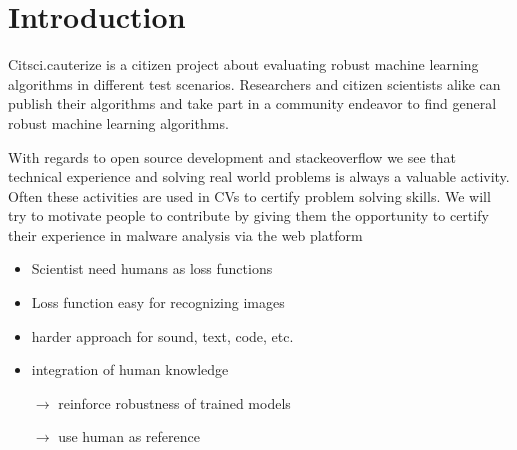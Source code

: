 \chapter{Introduction}\label{ch:introduction}
Citsci.cauterize is a citizen project about evaluating robust machine learning algorithms in different test scenarios.
Researchers and citizen scientists alike can publish their algorithms and take part in a community endeavor to find general robust machine learning algorithms.

With regards to open source development and stackeoverflow we see that technical experience and solving real world problems is always a valuable activity.
Often these activities are used in CVs to certify problem solving skills.
We will try to motivate people to contribute by giving them the opportunity to certify their experience in malware analysis via the web platform

\begin{itemize}
    \item Scientist need humans as loss functions
    \item Loss function easy for recognizing images
\end{itemize}

\begin{itemize}
    \item harder approach for sound, text, code, etc.
    \item integration of human knowledge
            
    $\rightarrow$ reinforce robustness of trained models

    $\rightarrow$ use human as reference
\end{itemize}
